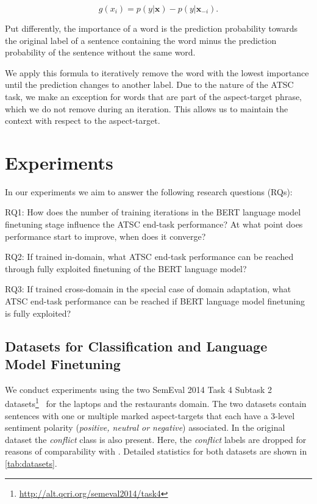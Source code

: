 \documentclass[11pt,a4paper]{article}
\newcommand{\rood}[1]{}
\begin{document}
\[ g(x_i) = p(y|\textbf{x}) - p(y|\textbf{x}_{-i}). \]

Put differently, the importance of a word is the prediction probability towards the original label of a sentence containing the word minus the prediction probability of the sentence without the same word.

We apply this formula to iteratively remove the word with the lowest importance until the prediction changes to another label. Due to the nature of the ATSC task, we make an exception for words that are part of the aspect-target phrase, which we do not remove during an iteration. This allows us to maintain the context with respect to the aspect-target.

\section{Experiments}
In our experiments we aim to answer the following research questions (RQs):

RQ1: How does the number of training iterations in the BERT language model finetuning stage influence the ATSC end-task performance? At what point does performance start to improve, when does it converge?

RQ2: If trained in-domain, what ATSC end-task performance can be reached through fully exploited finetuning of the BERT language model?

RQ3: If trained cross-domain in the special case of domain adaptation, what ATSC end-task performance can be reached if BERT language model finetuning is fully exploited?

\subsection{Datasets for Classification and Language Model Finetuning}
\rood{Outcome: Readers understand how we make use/preprocess and so on of SemEval 2014 Datasets and the corpora for LM finetuning}

We conduct experiments using the two SemEval 2014 Task 4 Subtask 2
datasets\footnote{\url{http://alt.qcri.org/semeval2014/task4}}~\cite{Pontiki2014}
for the laptops and the restaurants domain. The two datasets contain
sentences with one or multiple marked aspect-targets that each have a 3-level sentiment polarity (\textit{positive, neutral
  or negative}) associated. In the original dataset the
\textit{conflict} class is also present. Here, the \textit{conflict} labels are dropped for reasons of comparability with \citet{Xu2019}. Detailed statistics for both datasets are shown in \autoref{tab:datasets}.
\end{document}
